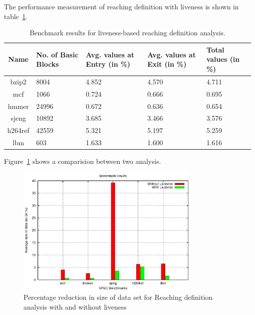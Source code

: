\documentclass[11pt,a4paper,openright]{report}
\begin{document}
The performance measurement of reaching definition with liveness is shown in table~\ref{tab:performance_with_l}.
\begin{table}[H]
  \begin{center}
    \begin{tabular}{|c|p{1.5cm}|p{2cm}|p{2cm}|p{2cm}|}
    \hline
      Name & No. of Basic Blocks & Avg. values at Entry (in \%) & Avg. values at Exit (in \%) & Total values (in \%)\\
      \hline
   	  bzip2 & 8004 & 4.852 & 4.570 & 4.711 \\ \hline
   	  mcf & 1066 & 0.724 & 0.666 & 0.695 \\ \hline
   	  hmmer & 24996 & 0.672 & 0.636  & 0.654 \\ \hline
   	  sjeng & 10892 & 3.685 & 3.466 & 3.576 \\ \hline
   	  h264ref & 42559 & 5.321 & 5.197 & 5.259\\ \hline
   	  lbm & 603 & 1.633 & 1.600 & 1.616\\ \hline
   	  
	\hline
    \end{tabular}
    \caption{Benchmark results for liveness-based reaching definition analysis.}
      \label{tab:performance_with_l}
  \end{center}
\end{table}


Figure~\ref{fig:bench_mark} shows a comparision between two analysis.
\begin{figure}[p]	
\centering
\includegraphics[width=0.8\textwidth]{graph.eps}
\caption{Percentage reduction in size of data set for Reaching definition analysis with and without liveness}
\label{fig:bench_mark}
\end{figure}
\end{document}
